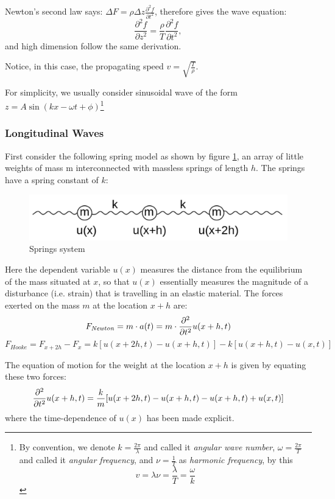 \documentclass[UTF8]{book}
\begin{document}
Newton's second law says: $\Delta F=\rho \Delta z\frac{\partial ^2f}{\partial t^2}$, therefore gives the wave equation: 
\begin{equation}
\frac{\partial ^2f}{\partial z^2}=\frac{\rho }{T}\frac{\partial ^2f}{\partial t^2},
\end{equation}
and high dimension follow the same derivation. 

Notice, in this case, the propagating speed $v=\sqrt{\frac{T}{\rho }}$.

For simplicity, we usually consider sinusoidal wave of the form $z=A\sin (kx-\omega t+\phi )$\footnote{By convention, we denote $k=\frac{2\pi }{\lambda }$ and called it \emph{angular wave number}, $\omega =\frac{2\pi }{T}$ and called it \emph{angular frequency}, and $\nu =\frac{1}{T}$ as \emph{harmonic frequency}, by this
\[v=\lambda \nu=\frac{\lambda }{T}=\frac{\omega }{k}\]}


\subsubsection{Longitudinal Waves}
First consider the following spring model as shown by figure \ref{fig:3}, an array of little weights of mass m interconnected with massless springs of length $h$. The springs have a spring constant of $k$:
\begin{figure}[H]
\centering
\includegraphics[scale=1]{Figure/3.PNG}
\caption{Springs system}
\label{fig:3}
\end{figure}
Here the dependent variable $u(x)$ measures the distance from the equilibrium of the mass situated at $x$, so that $u(x)$ essentially measures the magnitude of a disturbance (i.e. strain) that is travelling in an elastic material. The forces exerted on the mass $m$ at the location $x+h$ are:
\[F_{\mathit{Newton}}=m \cdot a(t)=m \cdot {{\partial^2 \over \partial t^2}u(x+h,t)}\]
\[F_\mathit{Hooke} = F_{x+2h} - F_x = k \left [ {u(x+2h,t) - u(x+h,t)} \right ] - k[u(x+h,t) - u(x,t)]\]

The equation of motion for the weight at the location $x+h$ is given by equating these two forces:
\[{\partial^2\over \partial t^2} u(x+h,t) = {k\over m}[u(x+2h,t)-u(x+h,t)-u(x+h,t)+u(x,t)]\]
where the time-dependence of $u(x)$ has been made explicit.
\end{document}
